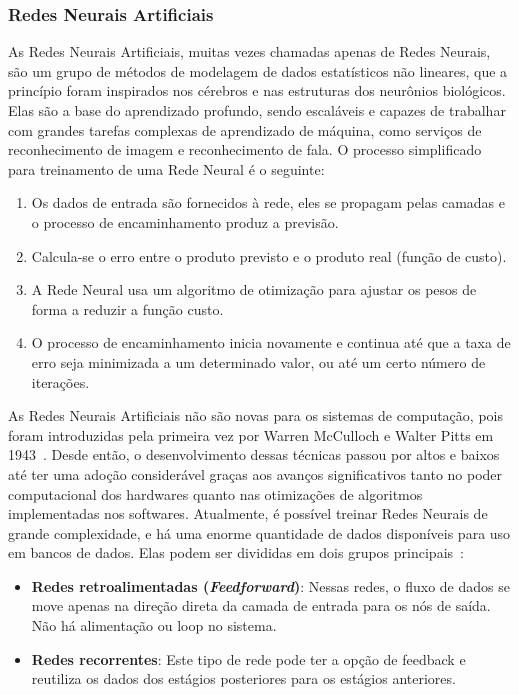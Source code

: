 \documentclass[Portugues,Final]{ic-tese-v3}
\begin{document}
\subsubsection{Redes Neurais Artificiais}

As Redes Neurais Artificiais, muitas vezes chamadas apenas de Redes Neurais, são um grupo de métodos de modelagem de dados estatísticos não lineares, que a princípio foram inspirados nos cérebros e nas estruturas dos neurônios biológicos. Elas são a base do aprendizado profundo, sendo escaláveis e capazes de trabalhar com grandes tarefas complexas de aprendizado de máquina, como serviços de reconhecimento de imagem e reconhecimento de fala. O processo simplificado para treinamento de uma Rede Neural é o seguinte:

\begin{enumerate}[label=\textbf{\arabic*.}]
\item Os dados de entrada são fornecidos à rede, eles se propagam pelas camadas e o processo de encaminhamento produz a previsão.
\item Calcula-se o erro entre o produto previsto e o produto real (função de custo).
\item A Rede Neural usa um algoritmo de otimização para ajustar os pesos de forma a reduzir a função custo.
\item O processo de encaminhamento inicia novamente e continua até que a taxa de erro seja minimizada a um determinado valor, ou até um certo número de iterações.
\end{enumerate}

As Redes Neurais Artificiais não são novas para os sistemas de computação, pois foram introduzidas pela primeira vez por Warren McCulloch e Walter Pitts em 1943~\cite{McCulloch_1943}. Desde então, o desenvolvimento dessas técnicas passou por altos e baixos até ter uma adoção considerável graças aos avanços significativos tanto no poder computacional dos hardwares quanto nas otimizações de algoritmos implementadas nos softwares. Atualmente, é possível treinar Redes Neurais de grande complexidade, e há uma enorme quantidade de dados disponíveis para uso em bancos de dados. Elas podem ser divididas em dois grupos principais~\cite{Singh_2009}:

\begin{itemize}
\item \textbf{Redes retroalimentadas (\textit{Feedforward})}: Nessas redes, o fluxo de dados se move apenas na direção direta da camada de entrada para os nós de saída. Não há alimentação ou loop no sistema.
\item \textbf{Redes recorrentes}: Este tipo de rede pode ter a opção de feedback e reutiliza os dados dos estágios posteriores para os estágios anteriores.
\end{itemize}
\end{document}
